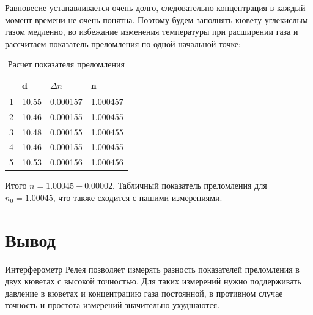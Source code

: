 \documentclass[a4paper,12pt]{article}
\begin{document}
	Равновесие устанавливается очень долго, следовательно концентрация  в каждый момент времени не очень понятна. Поэтому будем заполнять кювету углекислым газом медленно, во избежание изменения температуры при расширении газа и рассчитаем показатель преломления по одной начальной точке:
	
	
	\begin{table}[h!]
		\centering
		\caption{Расчет показателя преломления}
		\label{my-label}
		\begin{tabular}{|l|l|l|l|}
			\hline
			& d     & $\Delta n$ & n          \\ \hline
			1 & 10.55 & 0.000157   & 1.000457 \\ \hline
			2 & 10.46 & 0.000155   & 1.000455 \\ \hline
			3 & 10.48 & 0.000155   & 1.000455 \\ \hline
			4 & 10.46 & 0.000155   & 1.000455 \\ \hline
			5 & 10.53 & 0.000156   & 1.000456 \\ \hline
		\end{tabular}
	\end{table}
	
	\newpage
	
	
	Итого $n = 1.00045 \pm 0.00002$. Табличный показатель преломления для  $n_0 = 1.00045$, что также сходится с нашими измерениями.
	
	\section{Вывод}
	Интерферометр Релея позволяет измерять разность показателей преломления в двух кюветах с высокой точностью. Для таких измерений нужно поддерживать давление в кюветах и концентрацию газа постоянной, в противном случае точность и простота измерений значительно ухудшаются.
	

	
\end{document}
